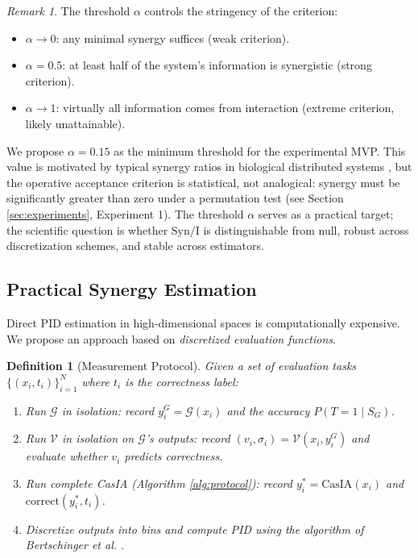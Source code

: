 \documentclass[11pt,a4paper]{article}
\newtheorem{definition}{Definition}[section]
\theoremstyle{remark}
\newtheorem{remark}{Remark}[section]
\newcommand{\Syn}{\mathrm{Syn}}
\newcommand{\MI}{\mathrm{I}}
\begin{document}
\begin{remark}
\label{rem:alpha}
The threshold $\alpha$ controls the stringency of the criterion:
\begin{itemize}
  \item $\alpha \to 0$: any minimal synergy suffices (weak criterion).
  \item $\alpha = 0.5$: at least half of the system's information is synergistic (strong criterion).
  \item $\alpha \to 1$: virtually all information comes from interaction (extreme criterion, likely unattainable).
\end{itemize}
We propose $\alpha = 0.15$ as the minimum threshold for the experimental MVP. This value is motivated by typical synergy ratios in biological distributed systems \cite{timme2018pid_neuro}, but the operative acceptance criterion is statistical, not analogical: synergy must be significantly greater than zero under a permutation test (see Section \ref{sec:experiments}, Experiment 1). The threshold $\alpha$ serves as a practical target; the scientific question is whether $\Syn/\MI$ is distinguishable from null, robust across discretization schemes, and stable across estimators.
\end{remark}

\subsection{Practical Synergy Estimation}

Direct PID estimation in high-dimensional spaces is computationally expensive. We propose an approach based on \emph{discretized evaluation functions}.

\begin{definition}[Measurement Protocol]
\label{def:measurement}
Given a set of evaluation tasks $\{(x_i, t_i)\}_{i=1}^N$ where $t_i$ is the correctness label:
\begin{enumerate}
  \item Run $\mathcal{G}$ in isolation: record $y_i^G = \mathcal{G}(x_i)$ and the accuracy $P(T = 1 \mid S_G)$.
  \item Run $\mathcal{V}$ in isolation on $\mathcal{G}$'s outputs: record $(v_i, \sigma_i) = \mathcal{V}(x_i, y_i^G)$ and evaluate whether $v_i$ predicts correctness.
  \item Run complete CasIA (Algorithm \ref{alg:protocol}): record $y_i^* = \text{CasIA}(x_i)$ and $\text{correct}(y_i^*, t_i)$.
  \item Discretize outputs into bins and compute PID using the algorithm of Bertschinger et al. \cite{bertschinger2014pid}.
\end{enumerate}
\end{definition}
\end{document}
